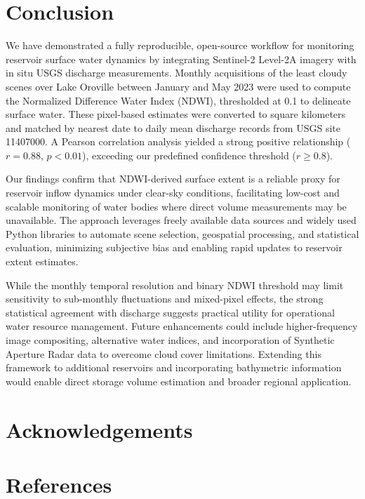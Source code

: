 \documentclass[preprint,12pt]{elsarticle}
\begin{document}
\section{Conclusion}

We have demonstrated a fully reproducible, open-source workflow for monitoring reservoir surface water dynamics by integrating Sentinel-2 Level-2A imagery with in situ USGS discharge measurements. Monthly acquisitions of the least cloudy scenes over Lake Oroville between January and May 2023 were used to compute the Normalized Difference Water Index (NDWI), thresholded at 0.1 to delineate surface water. These pixel-based estimates were converted to square kilometers and matched by nearest date to daily mean discharge records from USGS site 11407000. A Pearson correlation analysis yielded a strong positive relationship ($r = 0.88$, $p < 0.01$), exceeding our predefined confidence threshold ($r \ge 0.8$).

Our findings confirm that NDWI-derived surface extent is a reliable proxy for reservoir inflow dynamics under clear-sky conditions, facilitating low-cost and scalable monitoring of water bodies where direct volume measurements may be unavailable. The approach leverages freely available data sources and widely used Python libraries to automate scene selection, geospatial processing, and statistical evaluation, minimizing subjective bias and enabling rapid updates to reservoir extent estimates.

While the monthly temporal resolution and binary NDWI threshold may limit sensitivity to sub-monthly fluctuations and mixed-pixel effects, the strong statistical agreement with discharge suggests practical utility for operational water resource management. Future enhancements could include higher-frequency image compositing, alternative water indices, and incorporation of Synthetic Aperture Radar data to overcome cloud cover limitations. Extending this framework to additional reservoirs and incorporating bathymetric information would enable direct storage volume estimation and broader regional application.

\section*{Acknowledgements}


\section*{References}



\end{document}

